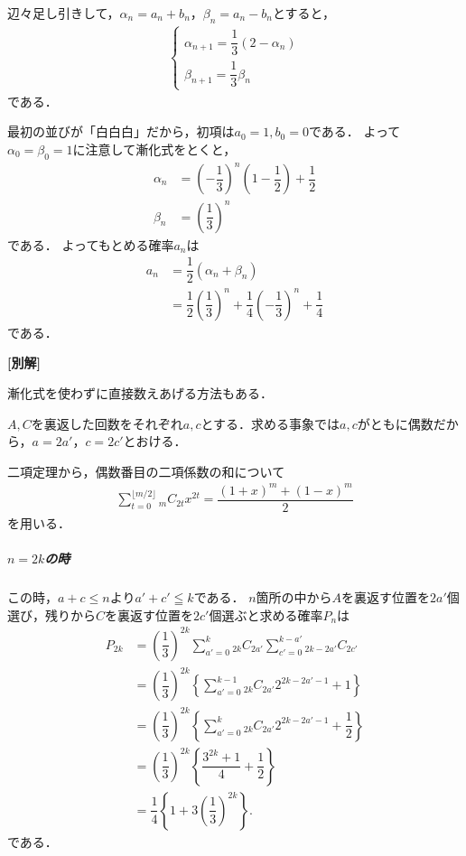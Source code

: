 \documentclass[../../main.tex]{subfiles}
\begin{document}
辺々足し引きして，$\alpha_n=a_n+b_n$，$\beta_n=a_n-b_n$とすると，
\begin{align}
  \begin{cases}
    \alpha_{n+1}=\dfrac{1}{3}(2-\alpha_n)\\
    \beta_{n+1}=\dfrac{1}{3}\beta_n
  \end{cases}
\end{align}
である．

最初の並びが「白白白」だから，初項は$a_0=1, b_0=0$である．
よって$\alpha_0=\beta_0=1$に注意して漸化式をとくと，
\begin{align}
  \alpha_n&=\left(-\dfrac{1}{3}\right)^n\left(1-\dfrac{1}{2}\right)+\dfrac{1}{2}\\
  \beta_n &=\left(\dfrac{1}{3}\right)^n
\end{align}
である．
よってもとめる確率$a_n$は
\begin{align}
  a_n
  &=\dfrac{1}{2}(\alpha_n+\beta_n)\\
  &=\dfrac{1}{2}\left(\dfrac{1}{3}\right)^n+\dfrac{1}{4}\left(-\dfrac{1}{3}\right)^n+\dfrac{1}{4}
\end{align}
である．

{\bf [別解]}

漸化式を使わずに直接数えあげる方法もある．

$A,C$を裏返した回数をそれぞれ$a,c$とする．求める事象では$a,c$がともに偶数だから，$a=2a'$，$c=2c'$とおける．

二項定理から，偶数番目の二項係数の和について
\begin{align}
  \sum_{t=0}^{\lfloor m/2\rfloor}{}_{m}C_{2t}x^{2t}
  =\dfrac{(1+x)^m+(1-x)^m}{2}
\end{align}
を用いる．

\subparagraph{$n=2k$の時}

この時，$a+c \le n$より$a'+c'\leqq k$である．
$n$箇所の中から$A$を裏返す位置を$2a'$個選び，残りから$C$を裏返す位置を$2c'$個選ぶと求める確率$P_{n}$は
\begin{align}
  P_{2k}
  &=\left(\dfrac{1}{3}\right)^{2k}
  \sum_{a'=0}^{k}{}_{2k}C_{2a'}
  \sum_{c'=0}^{k-a'}{}_{2k-2a'}C_{2c'}\\
  &=\left(\dfrac{1}{3}\right)^{2k}
  \left\{\sum_{a'=0}^{k-1}{}_{2k}C_{2a'}2^{2k-2a'-1}+1\right\}\\
  &=\left(\dfrac{1}{3}\right)^{2k}
  \left\{\sum_{a'=0}^{k}{}_{2k}C_{2a'}2^{2k-2a'-1}+\dfrac{1}{2}\right\}\\
  &=\left(\dfrac{1}{3}\right)^{2k}
  \left\{\dfrac{3^{2k}+1}{4}+\dfrac{1}{2}\right\}\\
  &=\dfrac{1}{4}\left\{1+3\left(\dfrac{1}{3}\right)^{2k}\right\}.
\end{align}
である．
\end{document}
